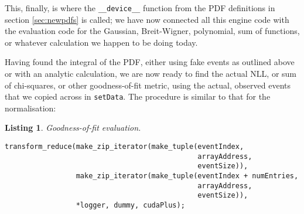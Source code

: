 \documentclass[12pt,pdflatex]{article}
\newtheorem{listing}{Listing}
\begin{document}
This, finally, is where the \verb|__device__| function from the PDF definitions
in section \ref{sec:newpdfs} is called; we have now connected all this engine
code with the evaluation code for the Gaussian, Breit-Wigner, polynomial, sum of
functions, or whatever calculation we happen to be doing today. 

Having found the integral of the PDF, either using fake events as outlined above
or with an analytic calculation, we are now ready to find the actual NLL, or sum of
chi-squares, or other goodness-of-fit metric, using the actual, observed events that
we copied across in \texttt{setData}. The procedure is similar to that for the normalisation:
\begin{listing}
\label{listing:nlleval}
Goodness-of-fit evaluation.

\begin{verbatim}
transform_reduce(make_zip_iterator(make_tuple(eventIndex, 
                                              arrayAddress, 
                                              eventSize)),
                 make_zip_iterator(make_tuple(eventIndex + numEntries, 
                                              arrayAddress, 
                                              eventSize)),
                 *logger, dummy, cudaPlus);   
\end{verbatim}
\end{listing}
\end{document}
